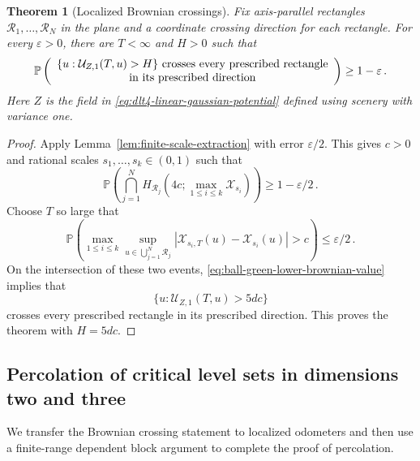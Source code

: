 \documentclass[11pt]{amsart}
\theoremstyle{plain}
\newtheorem{theorem}{Theorem}[section]
\theoremstyle{definition}
\renewcommand{\P}{\mathbb{P}}
\begin{document}
\begin{theorem}[Localized Brownian crossings]\label{thm:limiting-odometer-crossing}
Fix axis-parallel rectangles $\mathcal R_1,\ldots,\mathcal R_N$ in the plane
and a coordinate crossing direction for each rectangle. For every
$\varepsilon>0$, there are $T<\infty$ and $H>0$ such that
\[
    \P\left(
    \begin{array}{c}
    \{u:\mathcal U_{Z,1}(T,u)>H\}
    \textup{ crosses every prescribed rectangle}\\
    \textup{in its prescribed direction}
    \end{array}
    \right)\geq1-\varepsilon\, .
\]
Here $Z$ is the field in \eqref{eq:dlt4-linear-gaussian-potential} defined using
scenery with variance one.
\end{theorem}
\begin{proof}
Apply Lemma~\ref{lem:finite-scale-extraction} with error
$\varepsilon/2$. This gives $c>0$ and rational scales
$s_1,\ldots,s_k\in(0,1)$ such that
\[
    \P\left(
    \bigcap_{j=1}^N H_{\mathcal R_j}(4c;\max_{1\leq i\leq k}\mathcal X_{s_i})
    \right)\geq1-\varepsilon/2\, .
\]
Choose $T$ so large that
\[
    \P\left(
	    \max_{1\leq i\leq k}\sup_{u\in\bigcup_{j=1}^N\mathcal R_j}
    |\mathcal X_{s_i,T}(u)-\mathcal X_{s_i}(u)|>c
    \right)\leq\varepsilon/2\, .
\]
On the intersection of these two events, \eqref{eq:ball-green-lower-brownian-value}
implies that
\[
    \{u:\mathcal U_{Z,1}(T,u)>5dc\}
\]
crosses every prescribed rectangle in its prescribed direction. This proves
the theorem with $H=5dc$.
\end{proof}


\subsection{Percolation of critical level sets in dimensions two and three}\label{sec:continuum-to-discrete}
We transfer the Brownian crossing statement to localized odometers and then use a finite-range dependent block argument to complete the proof of percolation.
\end{document}
